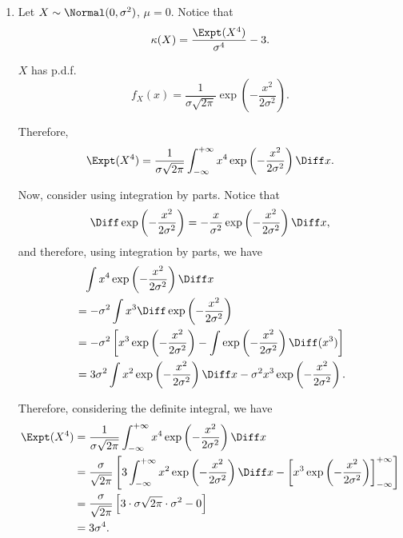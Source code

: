 \begin{enumerate}
    \item Let \(X \sim \Normal(0, \sigma^2)\), \(\mu = 0\).
          Notice that
          \begin{align*}
              \kappa(X) = \frac{\Expt(X^4)}{\sigma^4} - 3.
          \end{align*}

          \(X\) has p.d.f.
          \[
              f_X(x) = \frac{1}{\sigma\sqrt{2\pi}}\exp\left(-\frac{x^2}{2\sigma^2}\right).
          \]

          Therefore,
          \[
              \Expt(X^4) = \frac{1}{\sigma\sqrt{2\pi}} \int_{-\infty}^{+\infty} x^4 \exp\left(-\frac{x^2}{2\sigma^2}\right) \Diff x.
          \]

          Now, consider using integration by parts. Notice that
          \[
              \Diff \exp\left(-\frac{x^2}{2\sigma^2}\right) = - \frac{x}{\sigma^2} \exp\left(-\frac{x^2}{2\sigma^2}\right) \Diff x,
          \]
          and therefore, using integration by parts, we have
          \begin{align*}
               & \phantom{=} \int x^4 \exp\left(-\frac{x^2}{2\sigma^2}\right) \Diff x                                                               \\
               & = - \sigma^2 \int x^3 \Diff \exp\left(-\frac{x^2}{2\sigma^2}\right)                                                                \\
               & = - \sigma^2 \left[ x^3 \exp\left(-\frac{x^2}{2\sigma^2}\right) - \int \exp\left(-\frac{x^2}{2\sigma^2}\right) \Diff (x^3) \right] \\
               & = 3 \sigma^2 \int x^2 \exp\left(-\frac{x^2}{2\sigma^2}\right) \Diff x - \sigma^2 x^3 \exp\left(-\frac{x^2}{2\sigma^2}\right).
          \end{align*}

          Therefore, considering the definite integral, we have
          \begin{align*}
              \Expt(X^4) & = \frac{1}{\sigma\sqrt{2\pi}} \int_{-\infty}^{+\infty} x^4 \exp\left(-\frac{x^2}{2\sigma^2}\right) \Diff x                                                                                                 \\
                         & = \frac{\sigma}{\sqrt{2\pi}} \left[3 \int_{-\infty}^{+\infty} x^2 \exp \left(- \frac{x^2}{2\sigma^2}\right)\Diff x - \left[x^3 \exp\left(- \frac{x^2}{2 \sigma^2}\right)\right]^{+\infty}_{-\infty}\right] \\
                         & = \frac{\sigma}{\sqrt{2\pi}} \left[3 \cdot \sigma \sqrt{2\pi} \cdot \sigma^2 - 0\right]                                                                                                                    \\
                         & = 3 \sigma^4.
          \end{align*}


\end{enumerate}
